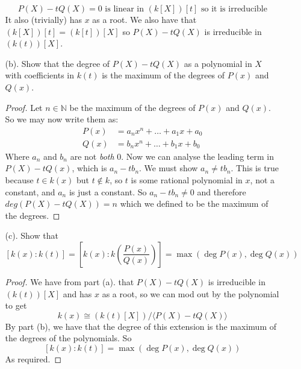 \documentclass[hidelinks,12pt]{article}
\newcommand{\N}{\mathbb{N}}
\begin{document}
\begin{enumerate}
\begin{enumerate}
            \[
                P(X)-tQ(X)=0\text{ is linear in }(k[X])[t]\text{ so it is irreducible}
            \]
            It also (trivially) has \(x\) as a root. We also have that \((k[X])[t]=(k[t])[X]\) so \(P(X)-tQ(X)\) is irreducible in \((k(t))[X]\).
        \item[(b).] Show that the degree of \(P(X)-tQ(X)\) as a polynomial in \(X\) with coefficients in \(k(t)\) is the maximum of the degrees of \(P(x)\) and \(Q(x)\).\begin{proof}
                Let \(n\in\N\) be the maximum of the degrees of \(P(x)\) and \(Q(x)\). So we may now write them as:
        \begin{align*}
            P(x)&=a_nx^n+\dots+a_1x+a_0\\
            Q(x)&=b_nx^n+\dots+b_1x+b_0
        \end{align*}
        Where \(a_n\) and \(b_n\) are not \emph{both} 0. Now we can analyse the leading term in \(P(X)-tQ(x)\), which is \(a_n-tb_n\). We must show \(a_n\neq tb_n\). This is true because \(t\in k(x)\) but \(t\notin k\), so \(t\) is some rational polynomial in \(x\), not a constant, and \(a_n\) is just a constant. So \(a_n-tb_n\neq0\) and therefore \(deg(P(X)-tQ(X))=n\) which we defined to be the maximum of the degrees.
        \end{proof}
        
    \item[(c).] Show that
        \[
            \left[k(x):k(t)\right]=\left[k(x):k\left(\frac{P(x)}{Q(x)}\right)\right]=\max(\deg P(x),\deg Q(x))
        \]
        \begin{proof}
            We have from part (a). that \(P(X)-tQ(X)\) is irreducible in \((k(t))[X]\) and has \(x\) as a root, so we can mod out by the polynomial to get \[
                k(x)\cong(k(t)[X])/\langle P(X)-tQ(X)\rangle
            \]
             By part (b), we have that the degree of this extension is the maximum of the degrees of the polynomials. So \[
                 [k(x):k(t)]=\max(\deg P(x),\deg Q(x))
             \]
              As required. 
        \end{proof}
    \end{enumerate}
\end{enumerate}
\end{document}
